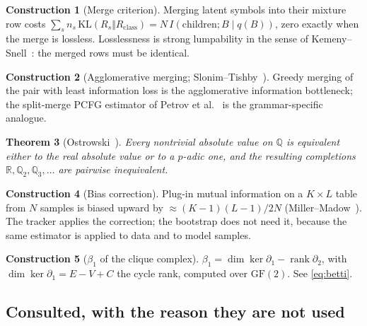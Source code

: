 \documentclass[11pt,a4paper]{article}
\theoremstyle{plain}
\newtheorem{theorem}{Theorem}
\theoremstyle{definition}
\newtheorem{construction}[theorem]{Construction}
\begin{document}
\begin{construction}[Merge criterion]
\label{con:merge}
Merging latent symbols into their mixture row costs
$\sum_s n_s\,\mathrm{KL}(R_s\Vert R_{\mathrm{class}}) = N\,I(\text{children};B
\mid q(B))$, zero exactly when the merge is lossless. Losslessness is strong
lumpability in the sense of Kemeny--Snell~\cite{kemeny1960}: the merged rows
must be identical.
\end{construction}

\begin{construction}[Agglomerative merging; Slonim--Tishby~\cite{slonim1999}]
\label{con:aib}
Greedy merging of the pair with least information loss is the agglomerative
information bottleneck; the split-merge PCFG estimator of Petrov et
al.~\cite{petrov2006} is the grammar-specific analogue.
\end{construction}

\begin{theorem}[Ostrowski~\cite{ostrowski1916}]
\label{thm:ostrowski}
Every nontrivial absolute value on $\mathbb{Q}$ is equivalent either to the
real absolute value or to a $p$-adic one, and the resulting completions
$\mathbb{R}, \mathbb{Q}_2, \mathbb{Q}_3, \dots$ are pairwise inequivalent.
\end{theorem}

\begin{construction}[Bias correction]
\label{con:mm}
Plug-in mutual information on a $K\times L$ table from $N$ samples is biased
upward by $\approx (K-1)(L-1)/2N$ (Miller--Madow~\cite{miller1955}). The
tracker applies the correction; the bootstrap does not need it, because the
same estimator is applied to data and to model samples.
\end{construction}

\begin{construction}[$\beta_1$ of the clique complex]
\label{con:betti}
$\beta_1 = \dim\ker\partial_1 - \operatorname{rank}\partial_2$, with
$\dim\ker\partial_1 = E - V + C$ the cycle rank, computed over
$\mathrm{GF}(2)$. See \eqref{eq:betti}.
\end{construction}

\subsection*{Consulted, with the reason they are not used}
\end{document}
